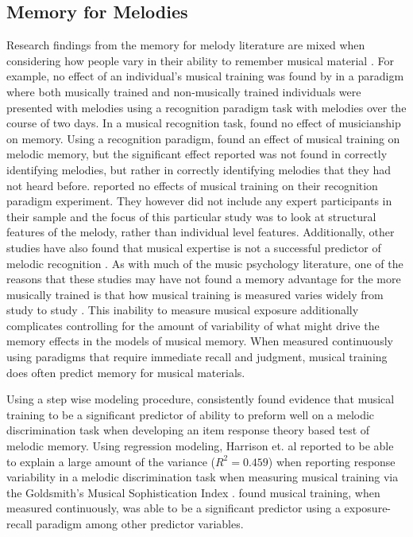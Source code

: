 \documentclass[]{book}
\begin{document}
\hypertarget{memory-for-melodies}{%
\subsection{Memory for Melodies}\label{memory-for-melodies}}

Research findings from the memory for melody literature are mixed when considering how people vary in their ability to remember musical material \citep{halpernMemoryMelodies2010}.
For example, no effect of an individual's musical training was found by \citet{mcauleyPlayItAgain2004} in a paradigm where both musically trained and non-musically trained individuals were presented with melodies using a recognition paradigm task with melodies over the course of two days.
In a musical recognition task, \citet{korenmanRoleFamiliarityEpisodic2004} found no effect of musicianship on memory.
Using a recognition paradigm, \citet{munganLevelsofProcessingEffectsRemember2011} found an effect of musical training on melodic memory, but the significant effect reported was not found in correctly identifying melodies, but rather in correctly identifying melodies that they had not heard before.
\citet{mullensiefenRoleFeaturesContext2014} reported no effects of musical training on their recognition paradigm experiment.
They however did not include any expert participants in their sample and the focus of this particular study was to look at structural features of the melody, rather than individual level features.
Additionally, other studies have also found that musical expertise is not a successful predictor of melodic recognition \citep{demorestLostTranslationEnculturation2008, halpernAgingExperienceRecognition1995}.
As with much of the music psychology literature, one of the reasons that these studies may have not found a memory advantage for the more musically trained is that how musical training is measured varies widely from study to study \citep{talaminiMusiciansHaveBetter2017}.
This inability to measure musical exposure additionally complicates controlling for the amount of variability of what might drive the memory effects in the models of musical memory.
When measured continuously using paradigms that require immediate recall and judgment, musical training does often predict memory for musical materials.

Using a step wise modeling procedure, \citet{harrisonModellingMelodicDiscrimination2016} consistently found evidence that musical training to be a significant predictor of ability to preform well on a melodic discrimination task when developing an item response theory based test of melodic memory.
Using regression modeling, Harrison et. al reported to be able to explain a large amount of the variance (\(R^2 = 0.459\)) when reporting response variability in a melodic discrimination task \citep{harrisonApplyingModernPsychometric2017a} when measuring musical training via the Goldsmith's Musical Sophistication Index \citep{mullensiefenMusicalityNonMusiciansIndex2014}.
\citet{bakerPerceptionLeitmotivesRichard2017} found musical training, when measured continuously, was able to be a significant predictor using a exposure-recall paradigm among other predictor variables.
\end{document}

